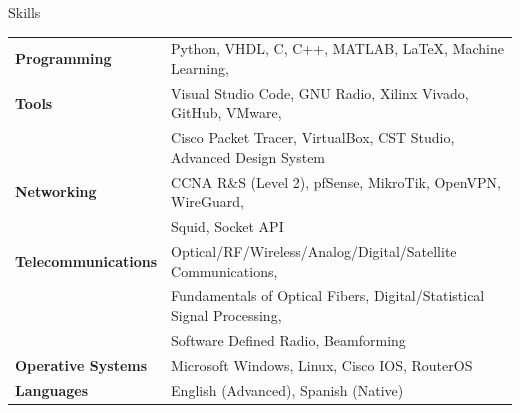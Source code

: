 \documentclass{resume} %
\begin{document}

\begin{rSection}{Skills}

    \begin{tabular}{ @{} >{\bfseries}l @{\hspace{6ex}} l }
        Programming        & Python, VHDL, C, C++, MATLAB, \LaTeX, Machine Learning,                \\
        Tools              & Visual Studio Code, GNU Radio, Xilinx Vivado, GitHub, VMware,          \\
                           & Cisco Packet Tracer, VirtualBox, CST Studio, Advanced Design System    \\
        Networking         & CCNA R\&S (Level 2), pfSense, MikroTik, OpenVPN, WireGuard,            \\
                           & Squid, Socket API                                                      \\
        Telecommunications & Optical/RF/Wireless/Analog/Digital/Satellite Communications,           \\
                           & Fundamentals of Optical Fibers, Digital/Statistical Signal Processing, \\
                           & Software Defined Radio, Beamforming                                    \\
        Operative Systems  & Microsoft Windows, Linux, Cisco IOS, RouterOS                          \\
        Languages          & English (Advanced), Spanish (Native)
    \end{tabular}

\end{rSection}
\end{document}
